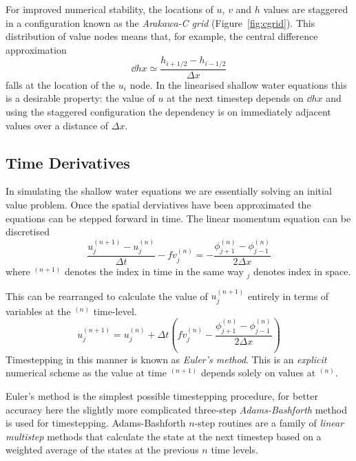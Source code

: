 \documentclass[a4paper, sfsidenotes, twoside]{tufte-handout}
\begin{document}
  For improved numerical stability, the locations of $u$, $v$ and $h$ values are staggered in a configuration known as the \emph{Arakawa-C grid} (Figure~\ref{fig:cgrid}).
  This distribution of value nodes means that, for example, the central difference approximation
  \begin{equation}
    \dd{h}{x} \simeq \frac{h_{i+1/2} - h_{i-1/2}}{\Delta x}
  \end{equation}
  falls at the location of the $u_i$ node.
  In the linearised shallow water equations this is a desirable property:
  the value of $u$ at the next timestep depends on $\dd{h}{x}$ and using
  the staggered configuration the dependency is on immediately adjacent values
  over a distance of $\Delta x$.

  \subsection{Time Derivatives}
  \label{sub:timederiv}

  In simulating the shallow water equations we are essentially solving
  an initial value problem.
  Once the spatial derviatives have been approximated the equations can
  be stepped forward in time.
  The linear momentum equation can be discretised
  \begin{equation}
    \frac{u_j^{(n+1)} - u_j^{(n)}}{\Delta t} - fv_j^{(n)} = - \frac{\phi_{j+1}^{(n)} - \phi_{j-1}^{(n)}}{2 \Delta x}
  \end{equation}
  where $^{(n+1)}$ denotes the index in time in the same way $_j$ denotes
  index in space.

  This can be rearranged to calculate the value of $u_j^{(n+1)}$ entirely in
  terms of variables at the $^{(n)}$ time-level.
  \begin{equation}
    u_j^{(n+1)} = u_j^{(n)} + {\Delta t}
      \left( fv_j^{(n)} - \frac{\phi_{j+1}^{(n)} - \phi_{j-1}^{(n)}}{2 \Delta x} \right)
  \end{equation}
  Timestepping in this manner is known as \emph{Euler's method}.
  This is an \emph{explicit} numerical scheme as the value at time $^{(n+1)}$
  depends solely on values at $^{(n)}$.

  Euler's method is the simplest possible timestepping procedure,
  for better accuracy here the slightly more complicated three-step \emph{Adams-Bashforth}
  method is used for timestepping.  Adams-Bashforth $n$-step routines are a family
  of \emph{linear multistep} methods that calculate the state at the next timestep
  based on a weighted average of the states at the previous $n$ time levels.
\end{document}
